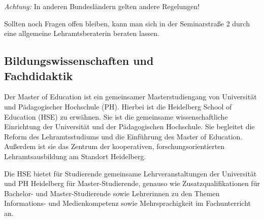 \emph{Achtung:} In anderen Bundesländern gelten andere Regelungen!

Sollten noch Fragen offen bleiben, kann man sich in der Seminarstraße 2 durch eine allgemeine Lehramtsberaterin beraten lassen.


\subsection{Bildungswissenschaften und \\Fachdidaktik}
Der Master of Education ist ein gemeinsamer Masterstudiengang von Universität und Pädagogischer Hochschule (PH). Hierbei ist die Heidelberg School of  Education (HSE) zu erwähnen. Sie ist die gemeinsame wissenschaftliche Einrichtung der Universität und der Pädagogischen Hochschule. Sie begleitet die Reform des Lehramtsstudiums und die Einführung des Master of Education. Außerdem ist sie das Zentrum der kooperativen, forschungsorientierten Lehramtsausbildung am Standort Heidelberg.

Die HSE bietet für Studierende gemeinsame Lehrveranstaltungen der Universität und PH Heidelberg für Master-Studierende, genauso wie Zusatzqualifikationen für Bachelor- und Master-Studierende sowie Lehrerinnen zu den Themen Informations- und Medienkompetenz sowie Mehrsprachigkeit im Fachunterricht an.



